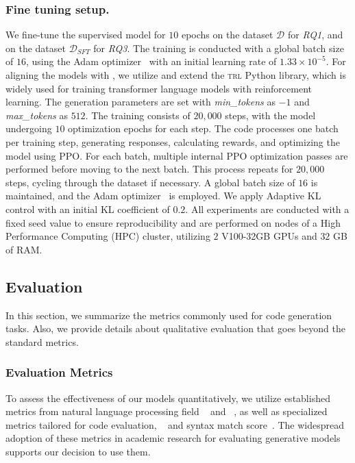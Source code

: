 \subsubsection{Fine tuning setup.} 

We fine-tune the supervised model for $10$ epochs on the dataset $\mathcal{D}$ for \textit{RQ1}, and on the dataset $\mathcal{D}_{SFT}$ 
for \textit{RQ3}. The training is conducted with a global batch size of $16$, using the Adam optimizer~\cite{kingma2017} with an initial learning rate of $1.33 \times 10^{-5}$. For aligning the models with \rl{}, we utilize and extend the \textsc{trl} Python library, which is widely used for training transformer language models with reinforcement learning. The generation parameters are set with \textit{min\_tokens} as $-1$ and \textit{max\_tokens} as $512$. The training consists of $20,000$ steps, with the model undergoing $10$ \ppo{} optimization epochs for each step. The code processes one batch per training step, generating responses, calculating rewards, and optimizing the model using PPO. For each batch, multiple internal PPO optimization passes are performed before moving to the next batch. This process repeats for $20,000$ steps, cycling through the dataset if necessary. A global batch size of $16$ is maintained, and the Adam optimizer~\cite{kingma2017} is employed. We apply Adaptive KL control with an initial KL coefficient of $0.2$. All experiments are conducted with a fixed seed value to ensure reproducibility and are performed on nodes of a High Performance Computing (HPC) cluster, utilizing $2$ V100-32GB GPUs and $32$ GB of RAM.

\subsection{Evaluation}
In this section, we summarize the metrics commonly used for code generation tasks.
Also, we provide details about qualitative evaluation that goes beyond the standard metrics.

\subsubsection{Evaluation Metrics}

To assess the effectiveness of our models quantitatively, we utilize established metrics from natural language processing field \bleu{}~\cite{papineni2002bleu} and \rouge{}~\cite{lin2004rouge}, as well as specialized metrics tailored for code evaluation, \codebleu{}~\cite{ren2020codebleumethodautomaticevaluation} and syntax match score~\cite{zhu2022xlcostbenchmarkdatasetcrosslingual}. 
The widespread adoption of these metrics in academic research for evaluating generative models supports our decision to use them. 


